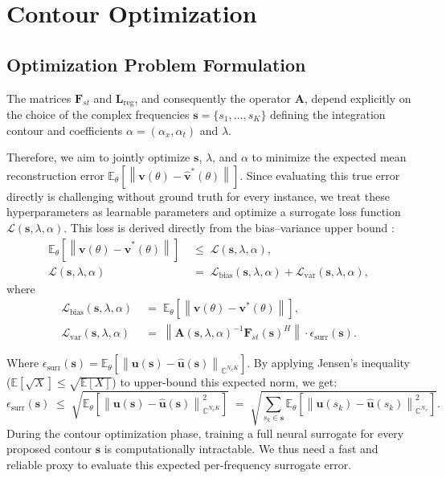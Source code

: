 \documentclass[11pt, a4paper]{article}
\newcommand{\C}{\mathbb{C}}
\newcommand{\E}{\mathbb{E}}
\newcommand{\norm}[1]{\left\|#1\right\|}
\begin{document}
\section{Contour Optimization}

\subsection{Optimization Problem Formulation}

The matrices $\mathbf{F}_{st}$ and $\mathbf{L}_{\mathrm{reg}}$, and consequently the operator $\mathbf{A}$, depend explicitly on the choice of the complex frequencies $\mathbf{s} = \{s_1, \ldots, s_K\}$ defining the integration contour and coefficients $\alpha = (\alpha_x, \alpha_t)$ and $\lambda$.

Therefore, we aim to jointly optimize $\mathbf{s}$, $\lambda$, and $\alpha$ to minimize the expected mean reconstruction error $\E_\theta\!\left[\norm{\mathbf{v}(\theta) - \hat{\mathbf{v}}^*(\theta)}\right]$. Since evaluating this true error directly is challenging without ground truth for every instance, we treat these hyperparameters as learnable parameters and optimize a surrogate loss function $\mathcal{L}(\mathbf{s}, \lambda, \alpha)$. This loss is derived directly from the bias--variance upper bound :
\begin{align}
    \E_\theta\!\left[\norm{\mathbf{v}(\theta) - \hat{\mathbf{v}}^*(\theta)}\right] \;&\leq\; \mathcal{L}(\mathbf{s}, \lambda, \alpha), \\
    \mathcal{L}(\mathbf{s}, \lambda, \alpha) \;&=\; \mathcal{L}_{\mathrm{bias}}(\mathbf{s}, \lambda, \alpha) + \mathcal{L}_{\mathrm{var}}(\mathbf{s}, \lambda, \alpha),
\end{align}
where
\begin{align}
    \mathcal{L}_{\mathrm{bias}}(\mathbf{s}, \lambda, \alpha) &\;=\; \E_\theta\!\left[\norm{\mathbf{v}(\theta) - \mathbf{v}^*(\theta)}\right], \\
    \mathcal{L}_{\mathrm{var}}(\mathbf{s}, \lambda, \alpha) &\;=\; \norm{\mathbf{A}(\mathbf{s}, \lambda, \alpha)^{-1}\mathbf{F}_{st}(\mathbf{s})^H} \cdot \epsilon_{\mathrm{surr}}(\mathbf{s}).
\end{align}


Where $\epsilon_{\mathrm{surr}}(\mathbf{s}) = \E_\theta\!\left[\norm{\mathbf{u}(\mathbf{s}) - \hat{\mathbf{u}}(\mathbf{s})}_{\C^{N_x K}}\right]$. By applying Jensen's inequality ($\E[\sqrt{X}] \leq \sqrt{\E[X]}$) to upper-bound this expected norm, we get:
\begin{equation}
    \epsilon_{\mathrm{surr}}(\mathbf{s}) \;\leq\; \sqrt{ \E_\theta\!\left[\norm{\mathbf{u}(\mathbf{s}) - \hat{\mathbf{u}}(\mathbf{s})}_{\C^{N_x K}}^2\right] } \;=\; \sqrt{ \sum_{s_k \in \mathbf{s}} \E_\theta\!\left[\norm{\mathbf{u}(s_k) - \hat{\mathbf{u}}(s_k)}_{\C^{N_x}}^2\right] }.
\end{equation}
During the contour optimization phase, training a full neural surrogate for every proposed contour $\mathbf{s}$ is computationally intractable. We thus need a fast and reliable proxy to evaluate this expected per-frequency surrogate error.
\end{document}
